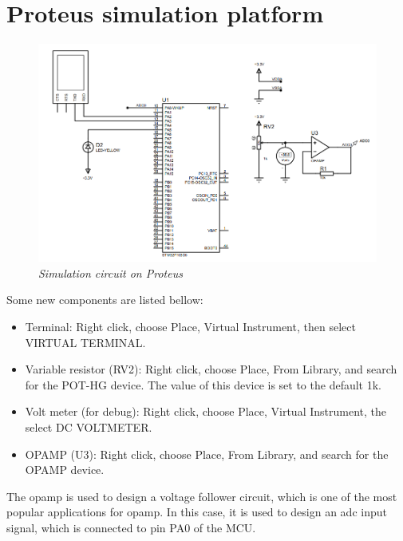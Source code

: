 \newpage
\section{Proteus simulation platform}

\begin{figure}[!htp]
    \centering
    \includegraphics[width=5in]{source/picture/bai_6/Proteus_Simulation.PNG}
    \caption{\textit{Simulation circuit on Proteus}}
    \label{bai4_pic_button_schematic_0}
\end{figure}

Some new components are listed bellow:
\begin{itemize}
    \item Terminal: Right click, choose Place, Virtual Instrument, then select VIRTUAL TERMINAL.
    \item Variable resistor (RV2): Right click, choose Place, From Library, and search for the POT-HG device. The value of this device is set to the default 1k.
    \item Volt meter (for debug): Right click, choose Place, Virtual Instrument, the select DC VOLTMETER.
    \item OPAMP (U3): Right click, choose Place, From Library, and search for the OPAMP device.
\end{itemize}

The opamp is used to design a voltage follower circuit, which is one of the most popular applications for opamp. In this case, it is used to design an adc input signal, which is connected to pin PA0 of the MCU.\\

